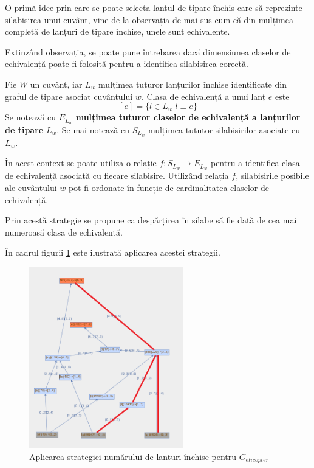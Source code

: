 O primă idee prin care se poate selecta lanțul de tipare închis care să reprezinte silabisirea unui cuvânt, vine de la observația de mai sus cum că din mulțimea completă de lanțuri de tipare închise, unele sunt echivalente. 

Extinzând observația, se poate pune întrebarea dacă dimensiunea claselor de echivalență poate fi folosită pentru a identifica silabisirea corectă. 

\begin{defi}
Fie $W$ un cuvânt, iar $L_w$ mulțimea tuturor lanțurilor închise identificate din graful de tipare asociat cuvântului $w$. Clasa de echivalență a unui lanț $e$ este 
\begin{equation}
\left[e\right] = \{l \in L_w \vert l \equiv e\}
\end{equation}
Se notează cu $E_{L_w}$\textbf{ mulțimea tuturor claselor de echivalență a lanțurilor de tipare} $L_w$. Se mai notează cu $S_{L_w}$ mulțimea tututor silabisirilor asociate cu $L_w$. 
\end{defi}

În acest context se poate utiliza o relație $f: S_{L_w} \rightarrow E_{L_w}$ pentru a identifica clasa de echivalență asociață cu fiecare silabisire. Utilizând relația $f$, silabisirile posibile ale cuvântului $w$ pot fi ordonate în funcție de cardinalitatea claselor de echivalență. 

Prin acestă strategie se propune ca despărțirea în silabe să fie dată de cea mai numeroasă clasa de echivalentă.

\begin{ex}
În cadrul figurii \ref{fig:rosil-counting} este ilustrată aplicarea acestei strategii. 
\end{ex}

\begin{figure}[h!]
    \centering
    \includegraphics[width=0.6\textwidth]{figures/rosil-counting.png}
    \caption{Aplicarea strategiei numărului de lanțuri închise pentru $G_{elicopter}$}
    \label{fig:rosil-counting}
\end{figure}

